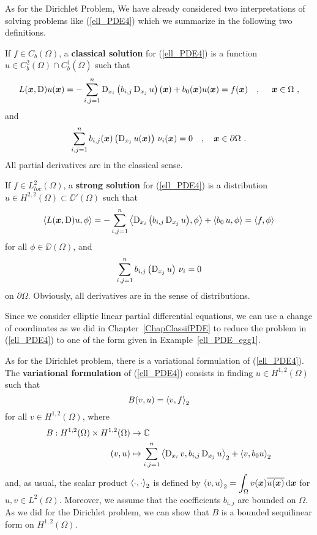 As for the Dirichlet Problem, We have already considered two
interpretations of solving problems like (\ref{ell_PDE4}) which we summarize
in the following two definitions.

\begin{defn}
If $f \in C_b(\Omega)$, a {\bfseries classical solution}
 for
(\ref{ell_PDE4}) is a function
$\displaystyle u \in C^2_b(\Omega) \cap C^1_b(\overline{\Omega})$ such that
\[
L({\bm{x}}, \operatorname{D})u({\bm{x}}) = -\sum_{i,j=1}^n
\operatorname{D}_{x_i} \left( b_{i,j} \operatorname{D}_{x_j} u \right)({\bm{x}})
+ b_0({\bm{x}}) u({\bm{x}}) = f({\bm{x}}) \quad , \quad \ {\bm{x}} \in \Omega \ ,
\]
and
\[
\sum_{i,j=1}^n b_{i,j}(\VEC{x}) \left( \diff_{x_j} u(\VEC{x}) \right)
\, \nu_i(\VEC{x})= 0  \quad , \quad \VEC{x} \in \partial \Omega \ .
\]
All partial derivatives are in the classical sense.
\end{defn}

\begin{defn}
If $\displaystyle f\in L_{loc}^2(\Omega)$, a {\bfseries strong solution}
 for
(\ref{ell_PDE4}) is a distribution
$\displaystyle u \in H^{2,2}(\Omega) \subset \DD'(\Omega)$ such that
\[
\left\langle{ L({\bm{x}},\operatorname{D})u} , {\phi}\right\rangle = -\sum_{i,j=1}^n
\left\langle{\operatorname{D}_{x_i}\left( b_{i,j} \operatorname{D}_{x_j} u \right)} , {\phi}\right\rangle
+ \left\langle{b_0 \, u} , {\phi}\right\rangle = \left\langle{f} , {\phi}\right\rangle
\]
for all $\displaystyle \phi \in \DD(\Omega)$, and
\[
\sum_{i,j=1}^n b_{i,j} \left( \operatorname{D}_{x_j} u \right)\, \nu_i= 0
\]
on $\partial \Omega$.  Obviously, all derivatives
are in the sense of distributions.
\end{defn}

Since we consider elliptic linear partial differential equations, we
can use a change of coordinates as we did
in Chapter~\ref{ChapClassifPDE} to reduce the problem in
(\ref{ell_PDE4}) to one of the form given in
Example~\ref{ell_PDE_egg1}.

As for the Dirichlet problem, there is a variational formulation of
(\ref{ell_PDE4}).  The {\bfseries variational formulation} of
(\ref{ell_PDE4}) consists in finding
$\displaystyle u\in H^{1,2}(\Omega)$ such that
\begin{equation} \label{ell_PDE5}
B(v,u) = \left\langle{v} , {f}\right\rangle_2
\end{equation}
for all $\displaystyle v \in H^{1,2}(\Omega)$, where
\begin{equation} \label{ell_PDE6}
\begin{split}
B : H^{1,2}(\Omega) \times H^{1,2}(\Omega) & \rightarrow \mathbb{C} \\
(v,u) &\mapsto
\sum_{i,j=1}^n \left\langle{\operatorname{D}_{x_i} v} , {b_{i,j} \operatorname{D}_{x_j} u}\right\rangle_2 + \left\langle{v} , {b_0 u}\right\rangle_2
\end{split}
\end{equation}
and, as usual, the scalar product $\left\langle{\cdot} , {\cdot}\right\rangle_2$ is defined by
$\displaystyle \left\langle{v} , {u}\right\rangle_2
= \int_\Omega v({\bm{x}})\overline{u({\bm{x}})} \,\mathrm{d}{{\bm{x}}}$ for
$\displaystyle u,v \in L^2(\Omega)$.
Moreover, we assume that the coefficients $b_{i,j}$ are
bounded on $\Omega$.  As we did for the Dirichlet problem, we can show
that $B$ is a bounded sequilinear form on $\displaystyle H^{1,2}(\Omega)$.

